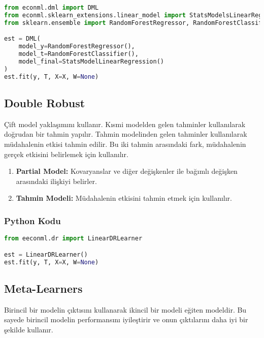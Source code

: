 \begin{lstlisting}[language=Python, caption=ecoml'de DML örneği.]
from econml.dml import DML
from econml.sklearn_extensions.linear_model import StatsModelsLinearRegression
from sklearn.ensemble import RandomForestRegressor, RandomForestClassifier

est = DML(
	model_y=RandomForestRegressor(),
	model_t=RandomForestClassifier(),
	model_final=StatsModelLinearRegression()
)
est.fit(y, T, X=X, W=None)
\end{lstlisting}

\newpage

\subsection{Double Robust}
Çift model yaklaşımını kullanır. Kısmi modelden gelen tahminler kullanılarak doğrudan bir tahmin yapılır. Tahmin modelinden gelen tahminler kullanılarak müdahalenin etkisi tahmin edilir. Bu iki tahmin arasındaki fark, müdahalenin gerçek etkisini belirlemek için kullanılır.

\begin{enumerate}
    \item \textbf{Partial Model:} Kovaryanslar ve diğer değişkenler ile bağımlı değişken arasındaki ilişkiyi belirler.
    \item \textbf{Tahmin Modeli:} Müdahalenin etkisini tahmin etmek için kullanılır.
\end{enumerate}

\subsubsection{Python Kodu}

\begin{lstlisting}[language=Python, caption=econml'de Double Robust örneği.]
from eeconml.dr import LinearDRLearner

est = LinearDRLearner()
est.fit(y, T, X=X, W=None)
\end{lstlisting}

\newpage

\subsection{Meta-Learners}
Birincil bir modelin çıktısını kullanarak ikincil bir modeli eğiten modeldir. Bu sayede birincil modelin performansını iyileştirir ve onun çıktılarını daha iyi bir şekilde kullanır.


